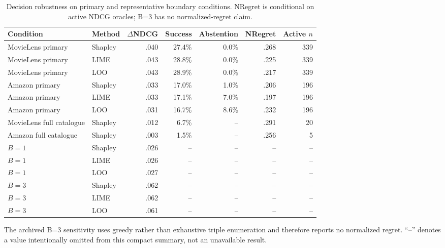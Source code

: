 \begin{table}[!htbp]
\centering\scriptsize
\caption{Decision robustness on primary and representative boundary conditions. NRegret is conditional on active NDCG oracles; B=3 has no normalized-regret claim.}
\label{tab:app-decisions}
\setlength{\tabcolsep}{3pt}
\begin{tabular}{@{}p{}p{}rrrrr@{}}
\toprule
Condition & Method & $\Delta$NDCG & Success & Abstention & NRegret & Active $n$ \\
\midrule
MovieLens primary & Shapley & .040 & 27.4\% & 0.0\% & .268 & 339 \\
MovieLens primary & LIME & .043 & 28.8\% & 0.0\% & .225 & 339 \\
MovieLens primary & LOO & .043 & 28.9\% & 0.0\% & .217 & 339 \\
Amazon primary & Shapley & .033 & 17.0\% & 1.0\% & .206 & 196 \\
Amazon primary & LIME & .033 & 17.1\% & 7.0\% & .197 & 196 \\
Amazon primary & LOO & .031 & 16.7\% & 8.6\% & .232 & 196 \\
MovieLens full catalogue & Shapley & .012 & 6.7\% & -- & .291 & 20 \\
Amazon full catalogue & Shapley & .003 & 1.5\% & -- & .256 & 5 \\
\midrule
$B=1$ & Shapley & .026 & -- & -- & -- & -- \\
$B=1$ & LIME & .026 & -- & -- & -- & -- \\
$B=1$ & LOO & .027 & -- & -- & -- & -- \\
$B=3$ & Shapley & .062 & -- & -- & -- & -- \\
$B=3$ & LIME & .062 & -- & -- & -- & -- \\
$B=3$ & LOO & .061 & -- & -- & -- & -- \\
\bottomrule
\end{tabular}
\end{table}

\noindent The archived B=3 sensitivity uses greedy rather than exhaustive triple enumeration and therefore reports no normalized regret. ``--'' denotes a value intentionally omitted from this compact summary, not an unavailable result.
